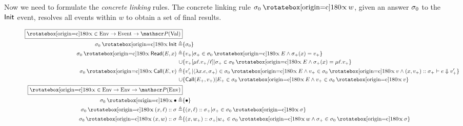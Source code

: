 Now we need to formulate the \emph{concrete linking} rules.
The concrete linking rule $\ctx_0\semlink w$, given an answer $\sigma_0$ to the $\textsf{Init}$ event, resolves all events within $w$ to obtain a set of final results.

\begin{figure}
  \begin{align*}
    \fbox{$\semlink\in\Ctx\rightarrow\Event\rightarrow\pset(\Value)$}                                                                                                                               \\
    \ctx_0\semlink\InitE\triangleq                         & \{\ctx_0\}                                                                                                                             \\
    \ctx_0\semlink\ReadE(\event,x)\triangleq               & \{v_+|\ctx_+\in\ctx_0\semlink\event\land\ctx_+(x)=v_+\}                                                                                \\
    \cup                                                   & \{v_+[\mu\ell.v_+/\ell]|\ctx_+\in\ctx_0\semlink E\land\ctx_+(x)=\mu\ell.v_+\}                                                          \\
    \ctx_0\semlink\CallE(\event,v)\triangleq               & \{v_+'|\langle\lambda x.e,\ctx_+\rangle\in\ctx_0\semlink E\land v_+\in\ctx_0\semlink v\land(x,v_+)\cons\ctx_+\vdash e\Downarrow v_+'\} \\
    \cup                                                   & \{\CallE(\event_+,v_+)|\event_+\in\ctx_0\semlink\event\land v_+\in\ctx_0\semlink v\}                                                   \\
    \fbox{$\semlink\in\Ctx\rightarrow\Ctx\rightarrow\pset(\Ctx)$}                                                                                                                                   \\
    \ctx_0\semlink\bullet\triangleq                        & \{\bullet\}                                                                                                                            \\
    \ctx_0\semlink(x,\ell)\cons\ctx\triangleq              & \{(x,\ell)\cons\ctx_+|\ctx_+\in\ctx_0\semlink\ctx\}                                                                                    \\
    \ctx_0\semlink(x,w)\cons\ctx\triangleq                 & \{(x,w_+)\cons\ctx_+|w_+\in\ctx_0\semlink w\land\ctx_+\in\ctx_0\semlink\ctx\}                                                          \\

\end{align*}
\end{figure}
